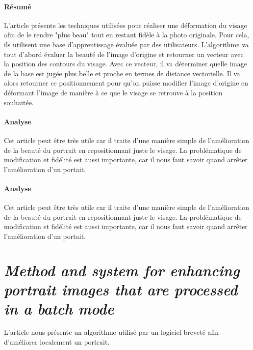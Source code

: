 \documentclass[11pt, french]{report-rd-info}
\begin{document}
\paragraph{Résumé}
L'article présente les techniques utilisées pour réaliser une déformation du visage afin de le rendre  "plus beau" tout en restant fidèle à la photo originale. Pour cela, ils utilisent une base d'apprentissage évaluée par des utilisateurs.
L'algorithme va tout d'abord évaluer la beauté de l'image d'origine et retourner un vecteur avec la position des contours du visage. Avec ce vecteur, il va déterminer quelle image de la base est jugée plus belle et proche en termes de distance vectorielle. Il va alors retourner ce positionnement pour qu'on puisse modifier l'image d'origine en déformant l'image de manière à ce que le visage se retrouve à la position souhaitée.
\paragraph{Analyse}
Cet article peut être très utile car il traite d'une manière simple de l'amélioration de la beauté du portrait en repositionnant juste le visage. La problématique de modification et fidélité est aussi importante, car il nous faut savoir quand arrêter l'amélioration d'un portait.
\paragraph{Analyse}
Cet article peut être très utile car il traite d'une manière simple de l'amélioration de la beauté du portrait en repositionnant juste le visage. La problématique de modification et fidélité est aussi importante, car il nous faut savoir quand arrêter l'amélioration d'un portait.
\section{\emph{Method and system for enhancing portrait images that are processed in a batch mode}}
L'article \cite{Matraszek2004} nous présente un algorithme utilisé par un logiciel breveté afin d'améliorer localement un portrait.
\end{document}
